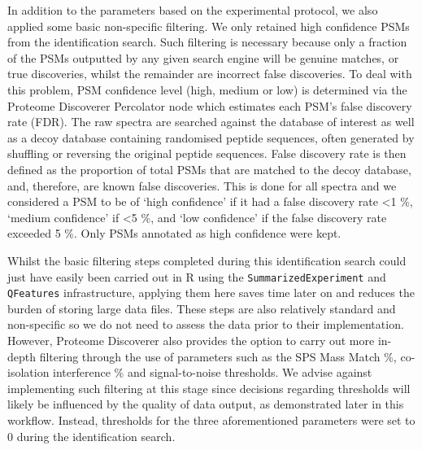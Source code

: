 \documentclass[9pt,a4paper,]{extarticle}
\begin{document}
In addition to the parameters based on the experimental protocol, we also
applied some basic non-specific filtering. We only retained high confidence PSMs
from the identification search. Such filtering is necessary because only a
fraction of the PSMs outputted by any given search engine will be genuine
matches, or true discoveries, whilst the remainder are incorrect false
discoveries. To deal with this problem, PSM confidence level (high, medium or
low) is determined via the Proteome Discoverer Percolator node \citep{Kll2007} which
estimates each PSM's false discovery rate (FDR). The raw spectra are searched
against the database of interest as well as a decoy database containing
randomised peptide sequences, often generated by shuffling or reversing the
original peptide sequences. False discovery rate is then defined as the
proportion of total PSMs that are matched to the decoy database, and, therefore,
are known false discoveries. This is done for all spectra and we considered a
PSM to be of `high confidence' if it had a false discovery rate \textless1 \%, `medium
confidence' if \textless5 \%, and `low confidence' if the false discovery rate exceeded
5 \%. Only PSMs annotated as high confidence were kept.

Whilst the basic filtering steps completed during this identification search
could just have easily been carried out in R using the \texttt{SummarizedExperiment}
and \texttt{QFeatures} infrastructure, applying them here saves time later on and
reduces the burden of storing large data files. These steps are also relatively
standard and non-specific so we do not need to assess the data prior to their
implementation. However, Proteome Discoverer also provides the option to carry
out more in-depth filtering through the use of parameters such as the SPS Mass
Match \%, co-isolation interference \% and signal-to-noise thresholds. We advise
against implementing such filtering at this stage since decisions regarding
thresholds will likely be influenced by the quality of data output, as
demonstrated later in this workflow. Instead, thresholds for the three
aforementioned parameters were set to 0 during the identification search.

{\small}
\end{document}

